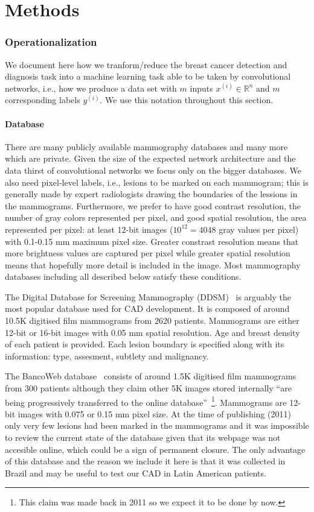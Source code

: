 \documentclass[11pt]{article}
\begin{document}
	\part{Methods}
	\section{Operationalization}
	We document here how we tranform/reduce the breast cancer detection and diagnosis task into a machine learning task able to be taken by convolutional networks, i.e., how we produce a data set with $m$ inputs $x^{(i)} \in \mathbb{R}^n$ and $m$ corresponding labels $y^{(i)}$. We use this notation throughout this section. 

	\subsection{Database}
	There are many publicly available mammography databases and many more which are private. Given the size of the expected network architecture and the data thirst of convolutional networks we focus only on the bigger databases. We also need pixel-level labels, i.e., lesions to be marked on each mammogram; this is generally made by expert radiologists drawing the boundaries of the lessions in the mammograms.
Furthermore, we prefer to have good contrast resolution, the number of gray colors represented per pixel, and good spatial resolution, the area represented per pixel: at least 12-bit images ($10^12 = 4048$ gray values per pixel) with 0.1-0.15 mm maximum pixel size. Greater constrast resolution means that more brightness values are captured per pixel while greater spatial resolution means that hopefully more detail is included in the image. Most mammography databases including all described below satisfy these conditions.
 
	The Digital Database for Screening Mammography (DDSM)~\cite{Heath2001} is arguably the most popular database used for CAD development. It is composed of around 10.5K digitised film mammograms from 2620 patients. Mammograms are either 12-bit or 16-bit images with 0.05 mm spatial resolution. Age and breast density of each patient is provided. Each lesion boundary is specified along with its information: type, assesment, subtlety and malignancy.

	The BancoWeb database~\cite{Nepomuceno2011} consists of around 1.5K digitised film mammograms from 300 patients although they claim other 5K images stored internally ``are being progressively transferred to the online database''~\footnote{This claim was made back in 2011 so we expect it to be done by now.}. Mammograms are 12-bit images with 0.075 or 0.15 mm pixel size. At the time of publishing (2011) only very few lesions had been marked in the mammograms and it was impossible to review the current state of the database given that its webpage was not accesible online, which could be a sign of permanent closure. The only advantage of this database and the reason we include it here is that it was collected in Brazil and may be useful to test our CAD in Latin American patients.
\end{document}
